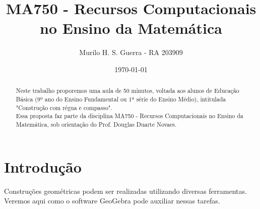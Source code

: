 \documentclass[11pt,a4paper]{article}
\title{MA750 - Recursos Computacionais no Ensino da Matemática}
\author{Murilo H. S. Guerra - RA 203909}
\date{\today}
\begin{document}
\maketitle
\begin{abstract}
    Neste trabalho proporemos uma aula de 50 minutos, voltada aos alunos de Educação Básica (9º ano do Ensino Fundamental ou 1ª série do Ensino Médio), intitulada "Construção com régua e compasso".\\
    Essa proposta faz parte da disciplina MA750 - Recursos Computacionais no Ensino da Matemática, sob orientação do Prof. Douglas Duarte Novaes.
\end{abstract}

\newpage

\tableofcontents

\newpage

\section{Introdução}
Construções geométricas podem ser realizadas utilizando diversas ferramentas. Veremos aqui como o software GeoGebra pode auxiliar nessas tarefas.

\end{document}
